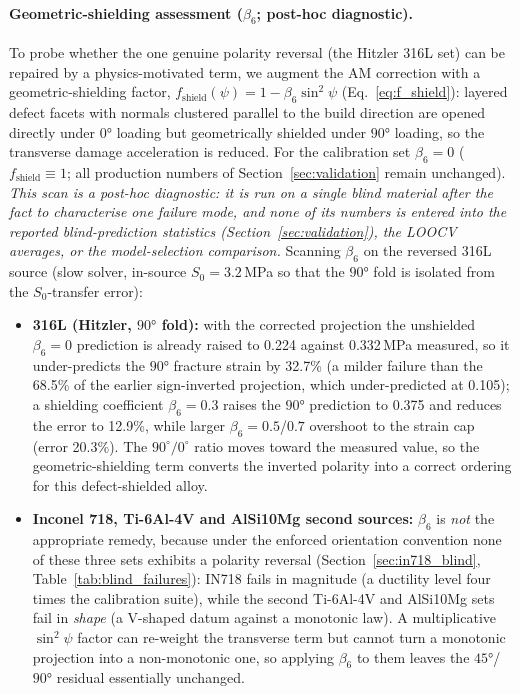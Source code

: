 \documentclass[twocolumn]{sagej}
\begin{document}
\paragraph{Geometric-shielding assessment ($\beta_6$; post-hoc diagnostic).}
To probe whether the one genuine polarity reversal (the Hitzler 316L set) can be repaired by a physics-motivated term, we augment the AM correction with a geometric-shielding factor, $f_{\text{shield}}(\psi) = 1 - \beta_6 \sin^2\psi$ (Eq.~\eqref{eq:f_shield}): layered defect facets with normals clustered parallel to the build direction are opened directly under $\ang{0}$ loading but geometrically shielded under $\ang{90}$ loading, so the transverse damage acceleration is reduced. For the calibration set $\beta_6 = 0$ ($f_{\text{shield}} \equiv 1$; all production numbers of Section~\ref{sec:validation} remain unchanged). \emph{This scan is a post-hoc diagnostic: it is run on a single blind material after the fact to characterise one failure mode, and none of its numbers is entered into the reported blind-prediction statistics (Section~\ref{sec:validation}), the LOOCV averages, or the model-selection comparison.} Scanning $\beta_6$ on the reversed 316L source (slow solver, in-source $S_0 = 3.2$\,MPa so that the $\ang{90}$ fold is isolated from the $S_0$-transfer error):
\begin{itemize}
\item \textbf{316L (Hitzler, $\ang{90}$ fold):} with the corrected projection the unshielded $\beta_6 = 0$ prediction is already raised to 0.224 against 0.332\,MPa measured, so it under-predicts the $\ang{90}$ fracture strain by 32.7\% (a milder failure than the 68.5\% of the earlier sign-inverted projection, which under-predicted at 0.105); a shielding coefficient $\beta_6 = 0.3$ raises the $\ang{90}$ prediction to 0.375 and reduces the error to 12.9\%, while larger $\beta_6 = 0.5$/$0.7$ overshoot to the strain cap (error 20.3\%). The $90^\circ/0^\circ$ ratio moves toward the measured value, so the geometric-shielding term converts the inverted polarity into a correct ordering for this defect-shielded alloy.
\item \textbf{Inconel 718, Ti-6Al-4V and AlSi10Mg second sources:} $\beta_6$ is \emph{not} the appropriate remedy, because under the enforced orientation convention none of these three sets exhibits a polarity reversal (Section~\ref{sec:in718_blind}, Table~\ref{tab:blind_failures}): IN718 fails in magnitude (a ductility level four times the calibration suite), while the second Ti-6Al-4V and AlSi10Mg sets fail in \emph{shape} (a V-shaped datum against a monotonic law). A multiplicative $\sin^2\psi$ factor can re-weight the transverse term but cannot turn a monotonic projection into a non-monotonic one, so applying $\beta_6$ to them leaves the $\ang{45}$/$\ang{90}$ residual essentially unchanged.
\end{itemize}
\end{document}
